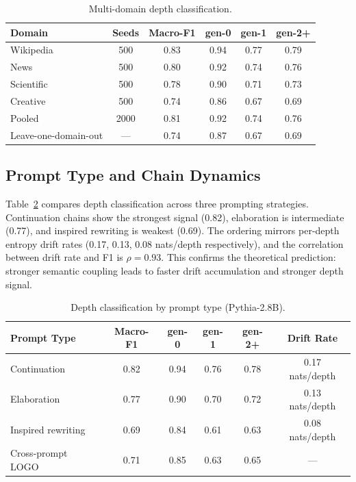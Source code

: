 \documentclass[letterpaper]{article}
\begin{document}
\begin{table}[t]
\centering
\caption{Multi-domain depth classification.}
\label{tab:domain}
\begin{tabular}{lccccc}
\toprule
Domain & Seeds & Macro-F1 & gen-0 & gen-1 & gen-2+ \\
\midrule
Wikipedia & 500 & 0.83 & 0.94 & 0.77 & 0.79 \\
News & 500 & 0.80 & 0.92 & 0.74 & 0.76 \\
Scientific & 500 & 0.78 & 0.90 & 0.71 & 0.73 \\
Creative & 500 & 0.74 & 0.86 & 0.67 & 0.69 \\
Pooled & 2000 & 0.81 & 0.92 & 0.74 & 0.76 \\
Leave-one-domain-out & --- & 0.74 & 0.87 & 0.67 & 0.69 \\
\bottomrule
\end{tabular}
\end{table}

\subsection{Prompt Type and Chain Dynamics}
\label{sec:prompt}

Table~\ref{tab:prompt} compares depth classification across three prompting strategies.
Continuation chains show the strongest signal (0.82), elaboration is intermediate (0.77), and inspired rewriting is weakest (0.69).
The ordering mirrors per-depth entropy drift rates (0.17, 0.13, 0.08 nats/depth respectively), and the correlation between drift rate and F1 is $\rho = 0.93$.
This confirms the theoretical prediction: stronger semantic coupling leads to faster drift accumulation and stronger depth signal.

\begin{table}[t]
\centering
\caption{Depth classification by prompt type (Pythia-2.8B).}
\label{tab:prompt}
\begin{tabular}{lccccc}
\toprule
Prompt Type & Macro-F1 & gen-0 & gen-1 & gen-2+ & Drift Rate \\
\midrule
Continuation & 0.82 & 0.94 & 0.76 & 0.78 & 0.17 nats/depth \\
Elaboration & 0.77 & 0.90 & 0.70 & 0.72 & 0.13 nats/depth \\
Inspired rewriting & 0.69 & 0.84 & 0.61 & 0.63 & 0.08 nats/depth \\
Cross-prompt LOGO & 0.71 & 0.85 & 0.63 & 0.65 & --- \\
\bottomrule
\end{tabular}
\end{table}
\end{document}
